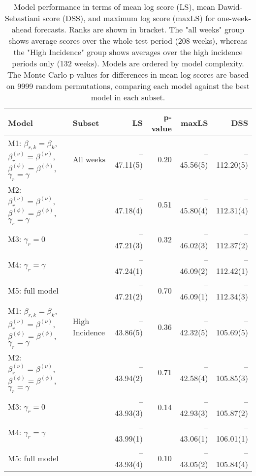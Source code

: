 \begin{table}[ht]
\centering
\begingroup\fontsize{9pt}{10pt}\selectfont
\begin{tabular}{ll|rrrr}
  \hline
Model & Subset & LS & p-value & maxLS & DSS \\ 
  \hline
M1: $\beta_{r,k} = \beta_{k}$, $\beta_{r}^{(\nu)} = \beta^{(\nu)}$, $\beta^{(\phi)} = \beta^{(\phi)}$, $\gamma_r = \gamma$ & All weeks & --47.11(5) & 0.20 & --45.56(5) & --112.20(5) \\ 
  M2: $\beta_{r}^{(\nu)} = \beta^{(\nu)}$, $\beta^{(\phi)} = \beta^{(\phi)}$, $\gamma_r = \gamma$ &  & --47.18(4) & 0.51 & --45.80(4) & --112.31(4) \\ 
  M3: $\gamma_r = 0$ &  & --47.21(3) & 0.32 & --46.02(3) & --112.37(2) \\ 
  M4: $\gamma_r = \gamma$ &  & --47.24(1) &  & --46.09(2) & --112.42(1) \\ 
  M5: full model &  & --47.21(2) & 0.70 & --46.09(1) & --112.34(3) \\ 
   \hline
M1: $\beta_{r,k} = \beta_{k}$, $\beta_{r}^{(\nu)} = \beta^{(\nu)}$, $\beta^{(\phi)} = \beta^{(\phi)}$, $\gamma_r = \gamma$ & High Incidence & --43.86(5) & 0.36 & --42.32(5) & --105.69(5) \\ 
  M2: $\beta_{r}^{(\nu)} = \beta^{(\nu)}$, $\beta^{(\phi)} = \beta^{(\phi)}$, $\gamma_r = \gamma$ &  & --43.94(2) & 0.71 & --42.58(4) & --105.85(3) \\ 
  M3: $\gamma_r = 0$ &  & --43.93(3) & 0.14 & --42.93(3) & --105.87(2) \\ 
  M4: $\gamma_r = \gamma$ &  & --43.99(1) &  & --43.06(1) & --106.01(1) \\ 
  M5: full model &  & --43.93(4) & 0.10 & --43.05(2) & --105.84(4) \\ 
   \hline
\end{tabular}
\endgroup
\caption{Model performance in terms of mean log score (LS), 
             mean Dawid-Sebastiani score (DSS), and maximum log score (maxLS) 
             for one-week-ahead forecasts.
             Ranks are shown in bracket.
             The "all weeks" group shows average scores over the 
             whole test period (208 weeks), 
             whereas the "High Incidence" group shows
             averages over the high incidence periods only (132 weeks).
             Models are ordered by model complexity.
             The Monte Carlo p-values for differences in mean log scores
             are based on 9999 random permutations,
             comparing each model against the best model in each subset.} 
\label{tab:forecast}
\end{table}
